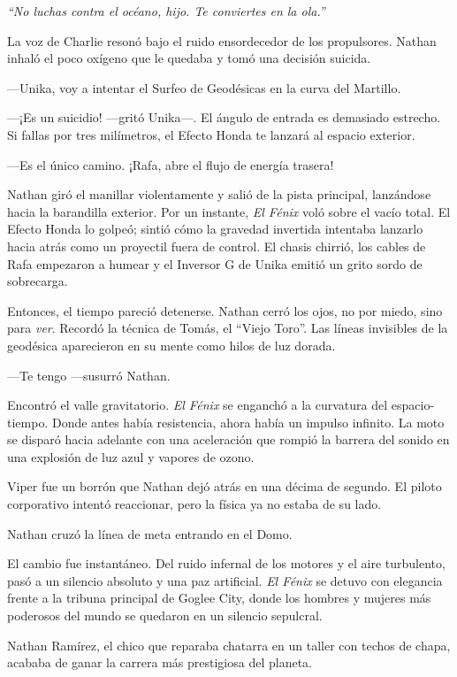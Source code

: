 \documentclass[12pt,a4paper]{book}
\begin{document}
\textit{``No luchas contra el océano, hijo. Te conviertes en la ola.''}

La voz de Charlie resonó bajo el ruido ensordecedor de los propulsores. Nathan inhaló el poco oxígeno que le quedaba y tomó una decisión suicida.

---Unika, voy a intentar el Surfeo de Geodésicas en la curva del Martillo.

---¡Es un suicidio! ---gritó Unika---. El ángulo de entrada es demasiado estrecho. Si fallas por tres milímetros, el Efecto Honda te lanzará al espacio exterior.

---Es el único camino. ¡Rafa, abre el flujo de energía trasera!

Nathan giró el manillar violentamente y salió de la pista principal, lanzándose hacia la barandilla exterior. Por un instante, \textit{El Fénix} voló sobre el vacío total. El Efecto Honda lo golpeó; sintió cómo la gravedad invertida intentaba lanzarlo hacia atrás como un proyectil fuera de control. El chasis chirrió, los cables de Rafa empezaron a humear y el Inversor G de Unika emitió un grito sordo de sobrecarga.

Entonces, el tiempo pareció detenerse. Nathan cerró los ojos, no por miedo, sino para \textit{ver}. Recordó la técnica de Tomás, el ``Viejo Toro''. Las líneas invisibles de la geodésica aparecieron en su mente como hilos de luz dorada.

---Te tengo ---susurró Nathan.

Encontró el valle gravitatorio. \textit{El Fénix} se enganchó a la curvatura del espacio-tiempo. Donde antes había resistencia, ahora había un impulso infinito. La moto se disparó hacia adelante con una aceleración que rompió la barrera del sonido en una explosión de luz azul y vapores de ozono.

Viper fue un borrón que Nathan dejó atrás en una décima de segundo. El piloto corporativo intentó reaccionar, pero la física ya no estaba de su lado.

Nathan cruzó la línea de meta entrando en el Domo.

El cambio fue instantáneo. Del ruido infernal de los motores y el aire turbulento, pasó a un silencio absoluto y una paz artificial. \textit{El Fénix} se detuvo con elegancia frente a la tribuna principal de Goglee City, donde los hombres y mujeres más poderosos del mundo se quedaron en un silencio sepulcral.

Nathan Ramírez, el chico que reparaba chatarra en un taller con techos de chapa, acababa de ganar la carrera más prestigiosa del planeta.
\end{document}
